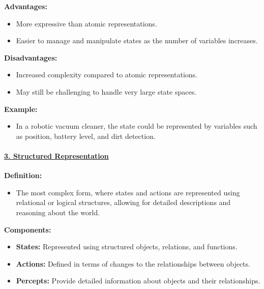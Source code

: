 \documentclass[
]{article}
\begin{document}
\textbf{Advantages:}

\begin{itemize}
\item
  More expressive than atomic representations.
\item
  Easier to manage and manipulate states as the number of variables
  increases.
\end{itemize}

\textbf{Disadvantages:}

\begin{itemize}
\item
  Increased complexity compared to atomic representations.
\item
  May still be challenging to handle very large state spaces.
\end{itemize}

\textbf{Example:}

\begin{itemize}
\item
  In a robotic vacuum cleaner, the state could be represented by
  variables such as position, battery level, and dirt detection.
\end{itemize}

\paragraph{\texorpdfstring{\ul{3. Structured
Representation}}{3. Structured Representation}}\label{3-structured-representation}

\textbf{Definition:}

\begin{itemize}
\item
  The most complex form, where states and actions are represented using
  relational or logical structures, allowing for detailed descriptions
  and reasoning about the world.
\end{itemize}

\textbf{Components:}

\begin{itemize}
\item
  \textbf{States:} Represented using structured objects, relations, and
  functions.
\item
  \textbf{Actions:} Defined in terms of changes to the relationships
  between objects.
\item
  \textbf{Percepts:} Provide detailed information about objects and
  their relationships.
\end{itemize}
\end{document}

